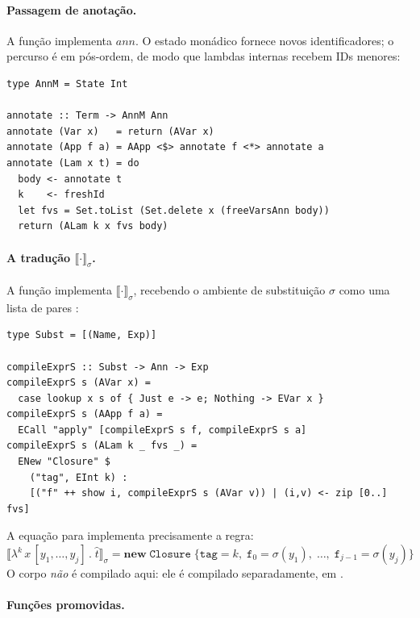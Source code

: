 \paragraph{Passagem de anotação.}

A função  implementa \(\mathit{ann}\). O estado
monádico fornece novos identificadores; o percurso é em pós-ordem,
de modo que lambdas internas recebem IDs menores:

\begin{verbatim}
type AnnM = State Int

annotate :: Term -> AnnM Ann
annotate (Var x)   = return (AVar x)
annotate (App f a) = AApp <$> annotate f <*> annotate a
annotate (Lam x t) = do
  body <- annotate t
  k    <- freshId
  let fvs = Set.toList (Set.delete x (freeVarsAnn body))
  return (ALam k x fvs body)
\end{verbatim}

\paragraph{A tradução \(\llbracket \cdot \rrbracket_\sigma\).}

A função  implementa \(\llbracket \cdot
\rrbracket_\sigma\), recebendo o ambiente de substituição \(\sigma\)
como uma lista de pares :

\begin{verbatim}
type Subst = [(Name, Exp)]

compileExprS :: Subst -> Ann -> Exp
compileExprS s (AVar x) =
  case lookup x s of { Just e -> e; Nothing -> EVar x }
compileExprS s (AApp f a) =
  ECall "apply" [compileExprS s f, compileExprS s a]
compileExprS s (ALam k _ fvs _) =
  ENew "Closure" $
    ("tag", EInt k) :
    [("f" ++ show i, compileExprS s (AVar v)) | (i,v) <- zip [0..] fvs]
\end{verbatim}

A equação para  implementa precisamente a regra:
\[
  \llbracket \lambda^k\, x\,[y_1,\ldots,y_j]\,.\;\hat{t}
  \rrbracket_\sigma
  = \mathbf{new}\;\mathtt{Closure}\;\{\mathtt{tag}=k,\;
  \mathtt{f}_0=\sigma(y_1),\;\ldots,\;\mathtt{f}_{j-1}=\sigma(y_j)\}
\]
O corpo  \emph{não} é compilado aqui: ele é compilado
separadamente, em .

\paragraph{Funções promovidas.}


